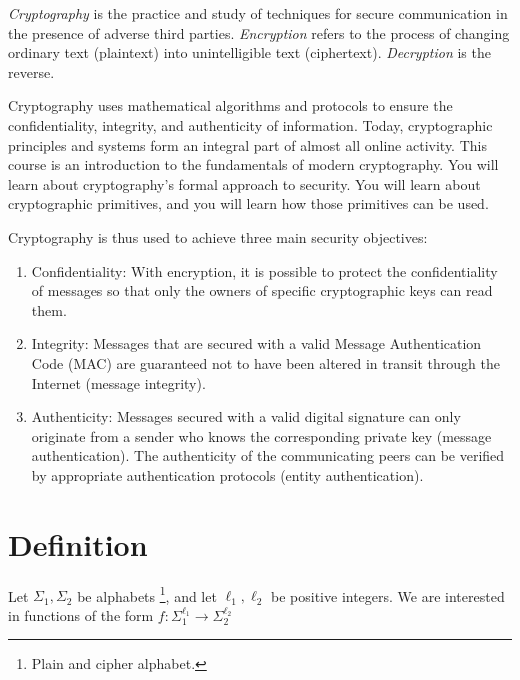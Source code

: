 \documentclass[a4paper, 12pt]{book} %
\begin{document}
\emph{Cryptography} is the practice and study of techniques for secure communication in the presence of adverse third parties. \emph{Encryption} refers to the process of changing ordinary text (plaintext) into unintelligible text (ciphertext). \emph{Decryption} is the reverse.



Cryptography uses mathematical algorithms and protocols to ensure the confidentiality, integrity, and authenticity of information. Today, cryptographic principles and systems form an integral part of almost all online activity. This course is an introduction to the fundamentals of modern cryptography. You will learn about cryptography's formal approach to security. You will learn about cryptographic primitives, and you will learn how those primitives can be used.



Cryptography is thus used to achieve three main security objectives:
\begin{enumerate}
    \item Confidentiality: With encryption, it is possible to protect the confidentiality of messages so that only the owners of specific cryptographic keys can read them.
    \item Integrity: Messages that are secured with a valid Message Authentication Code (MAC) are guaranteed not to have been altered in transit through the Internet (message integrity).
    \item Authenticity: Messages secured with a valid digital signature can only originate from a sender who knows the corresponding private key (message authentication). The authenticity of the communicating peers can be verified by appropriate authentication protocols (entity authentication).
\end{enumerate}



\section{Definition}

Let $\Sigma_1, \Sigma_2$ be alphabets \footnote{Plain and cipher alphabet.}, and let $\ell_1, \ell_2$ be positive integers. We are interested in functions of the form $f: \Sigma_1^{\ell_1} \longrightarrow \Sigma_2^{\ell_2}$
\end{document}
